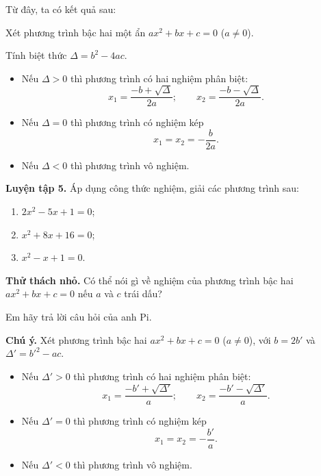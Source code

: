 \begin{lesson}
    Từ đây, ta có kết quả sau:

    \begin{keyconcept}
        Xét phương trình bậc hai một ẩn $ax^2+bx+c=0$ ($a\ne0$).

        Tính biệt thức $\Delta=b^2-4ac$.
        \begin{itemize}
            \item Nếu $\Delta>0$ thì phương trình có hai nghiệm phân biệt:
            \[
                x_1=\dfrac{-b+\sqrt{\Delta}}{2a};\qquad
                x_2=\dfrac{-b-\sqrt{\Delta}}{2a}.
            \]
            \item Nếu $\Delta=0$ thì phương trình có nghiệm kép
            \[
                x_1=x_2=-\dfrac{b}{2a}.
            \]
            \item Nếu $\Delta<0$ thì phương trình vô nghiệm.
        \end{itemize}
    \end{keyconcept}

    \textbf{Luyện tập 5.} Áp dụng công thức nghiệm, giải các phương trình sau:
    \begin{enumerate}[label=\alph*)]
        \item $2x^2-5x+1=0$;
        \item $x^2+8x+16=0$;
        \item $x^2-x+1=0$.
    \end{enumerate}

    \answerline
    \answerline
    \answerline

    \textbf{Thử thách nhỏ.} Có thể nói gì về nghiệm của phương trình bậc hai $ax^2+bx+c=0$ nếu $a$ và $c$ trái dấu?

    Em hãy trả lời câu hỏi của anh Pi.

    \answerline
    \answerline

    \textbf{Chú ý.} Xét phương trình bậc hai $ax^2+bx+c=0$ ($a\ne0$), với $b=2b'$ và $\Delta'=b'^2-ac$.
    \begin{itemize}
        \item Nếu $\Delta'>0$ thì phương trình có hai nghiệm phân biệt:
        \[
            x_1=\dfrac{-b'+\sqrt{\Delta'}}{a};\qquad
            x_2=\dfrac{-b'-\sqrt{\Delta'}}{a}.
        \]
        \item Nếu $\Delta'=0$ thì phương trình có nghiệm kép
        \[
            x_1=x_2=-\dfrac{b'}{a}.
        \]
        \item Nếu $\Delta'<0$ thì phương trình vô nghiệm.
    \end{itemize}


\end{lesson}
